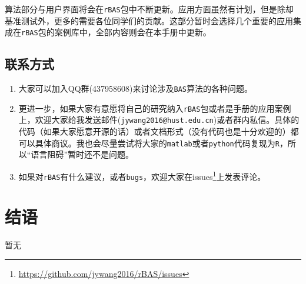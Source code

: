 \documentclass[]{ctexbook}
\renewcommand{\href}[2]{#2\footnote{\url{#1}}}
\theoremstyle{definition}
\theoremstyle{definition}
\theoremstyle{definition}
\theoremstyle{remark}
\begin{document}
算法部分与用户界面将会在\texttt{rBAS}包中不断更新。应用方面虽然有计划，但是除却基准测试外，更多的需要各位同学们的贡献。这部分暂时会选择几个重要的应用集成在\texttt{rBAS}包的案例库中，全部内容则会在本手册中更新。

\section{联系方式}

\begin{enumerate}
\def\labelenumi{\arabic{enumi}.}
\item
  大家可以加入QQ群(437958608)来讨论涉及\texttt{BAS}算法的各种问题。
\item
  更进一步，如果大家有意愿将自己的研究纳入\texttt{rBAS}包或者是手册的应用案例上，欢迎大家给我发送邮件(\texttt{jywang2016@hust.edu.cn})或者群内私信。具体的代码（如果大家愿意开源的话）或者文档形式（没有代码也是十分欢迎的）都可以具体商议。我也会尽量尝试将大家的\texttt{matlab}或者\texttt{python}代码复现为\texttt{R}，所以``语言阻碍''暂时还不是问题。
\item
  如果对\texttt{rBAS}有什么建议，或者\texttt{bugs}，欢迎大家在\href{https://github.com/jywang2016/rBAS/issues}{issues}上发表评论。
\end{enumerate}

\cleardoublepage 

\appendix {}


\chapter*{结语}


暂无



\backmatter
\printindex
\end{document}
